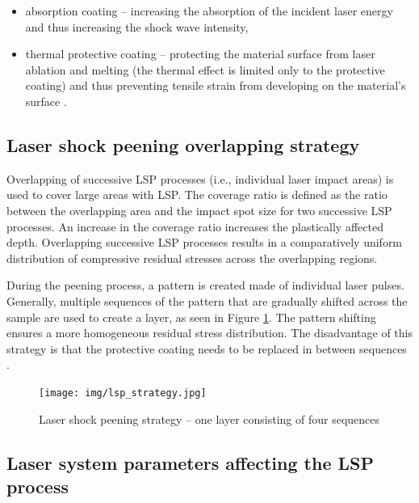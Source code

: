 \begin{itemize}
    \item absorption coating -- increasing the absorption of the incident laser energy and thus increasing the shock wave intensity,
    \item thermal protective coating -- protecting the material surface from laser ablation and melting (the thermal effect is limited only to the protective coating) and thus preventing tensile strain from developing on the material's surface \cite{hong_wang_guo_wu_wang_dai_xia_xie_1998}.
\end{itemize}

\subsection{Laser shock peening overlapping strategy}

Overlapping of successive LSP processes (i.e., individual laser impact areas) is used to cover large areas with LSP. The coverage ratio is defined as the ratio between the overlapping area and the impact spot size for two successive LSP processes. An increase in the coverage ratio increases the plastically affected depth. Overlapping successive LSP processes results in a comparatively uniform distribution of compressive residual stresses across the overlapping regions.

During the peening process, a pattern is created made of individual laser pulses. Generally, multiple sequences of the pattern that are gradually shifted across the sample are used to create a layer, as seen in Figure \ref{fig:lspstrategy}. The pattern shifting ensures a more homogeneous residual stress distribution. The disadvantage of this strategy is that the protective coating needs to be replaced in between sequences \cite{kaufman}.

\begin{figure}[h]
    \centering
    \texttt{[image: img/lsp\_strategy.jpg]}
    \caption[Laser shock peening strategy -- one layer consisting of four sequences]{Laser shock peening strategy -- one layer consisting of four sequences \protect\cite{bohm_kaufman_brajer_rostohar_2019}}
    \label{fig:lspstrategy}
\end{figure}



\subsection{Laser system parameters affecting the LSP process}

